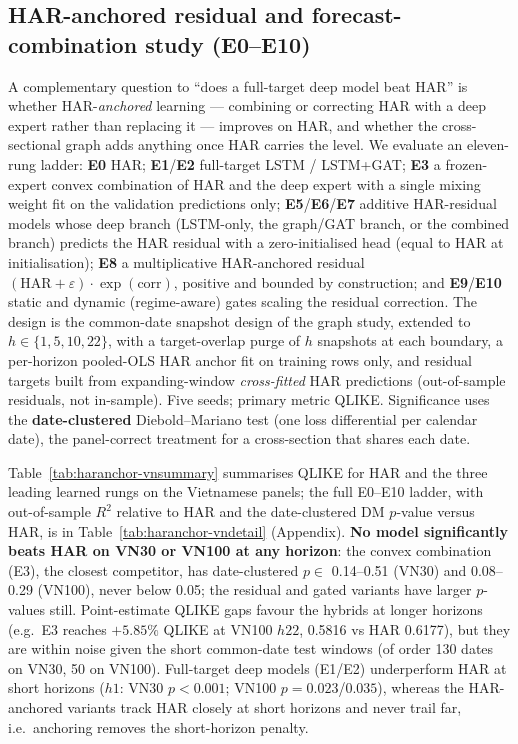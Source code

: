 \documentclass[runningheads]{llncs}
\begin{document}
\subsection{HAR-anchored residual and forecast-combination study (E0--E10)}\label{sec:haranchor}
A complementary question to ``does a full-target deep model beat HAR'' is whether HAR-\emph{anchored}
learning --- combining or correcting HAR with a deep expert rather than replacing it --- improves on HAR,
and whether the cross-sectional graph adds anything once HAR carries the level. We evaluate an eleven-rung
ladder: \textbf{E0} HAR; \textbf{E1}/\textbf{E2} full-target LSTM / LSTM+GAT; \textbf{E3} a frozen-expert
convex combination of HAR and the deep expert with a single mixing weight fit on the validation predictions
only; \textbf{E5}/\textbf{E6}/\textbf{E7} additive HAR-residual models whose deep branch (LSTM-only, the
graph/GAT branch, or the combined branch) predicts the HAR residual with a zero-initialised head (equal to
HAR at initialisation); \textbf{E8} a multiplicative HAR-anchored residual $(\mathrm{HAR}+\varepsilon)\cdot
\exp(\text{corr})$, positive and bounded by construction; and \textbf{E9}/\textbf{E10} static and dynamic
(regime-aware) gates scaling the residual correction. The design is the common-date snapshot design of the
graph study, extended to $h\in\{1,5,10,22\}$, with a target-overlap purge of $h$ snapshots at each boundary,
a per-horizon pooled-OLS HAR anchor fit on training rows only, and residual targets built from
expanding-window \emph{cross-fitted} HAR predictions (out-of-sample residuals, not in-sample). Five seeds;
primary metric QLIKE. Significance uses the \textbf{date-clustered} Diebold--Mariano test (one loss
differential per calendar date), the panel-correct treatment for a cross-section that shares each date.

Table~\ref{tab:haranchor-vnsummary} summarises QLIKE for HAR and the three leading learned rungs on the
Vietnamese panels; the full E0--E10 ladder, with out-of-sample $R^2$ relative to HAR and the date-clustered DM
$p$-value versus HAR, is in Table~\ref{tab:haranchor-vndetail} (Appendix).
\textbf{No model significantly beats HAR on VN30 or VN100 at any horizon}: the convex combination (E3), the closest competitor, has date-clustered $p\in$
0.14--0.51 (VN30) and 0.08--0.29 (VN100), never below 0.05; the residual and gated variants have larger
$p$-values still. Point-estimate QLIKE gaps favour the hybrids at longer horizons (e.g.\ E3 reaches
$+5.85\%$ QLIKE at VN100 $h22$, 0.5816 vs HAR 0.6177), but they are within noise given the short common-date
test windows (of order 130 dates on VN30, 50 on VN100). Full-target deep models (E1/E2) underperform HAR at
short horizons ($h1$: VN30 $p<0.001$; VN100 $p=0.023$/$0.035$), whereas the HAR-anchored variants track HAR
closely at short horizons and never trail far, i.e.\ anchoring removes the short-horizon penalty.
\end{document}
